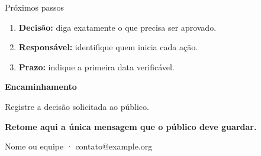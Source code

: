 \documentclass[aspectratio=169,11pt]{beamer}
\begin{document}
\begin{frame}{Próximos passos}
  \begin{enumerate}
    \item \textbf{Decisão:} diga exatamente o que precisa ser aprovado.
    \item \textbf{Responsável:} identifique quem inicia cada ação.
    \item \textbf{Prazo:} indique a primeira data verificável.
  \end{enumerate}
  \vfill
  {\IEEECSHeadingFont\bfseries\color{IEEEBlue}Encaminhamento\par}
  \smallskip
  Registre a decisão solicitada ao público.
\end{frame}


{
  \begin{frame}[plain]
    \centering
    \vfill
    {\IEEECSHeadingFont\bfseries\LARGE
      Retome aqui a única mensagem que o público deve guardar.\par}
    \vspace{6mm}
    Nome ou equipe · contato@example.org
    \vfill
    \IEEECSLogo[variant=orange-white,width=34mm]
  \end{frame}
}
\end{document}

